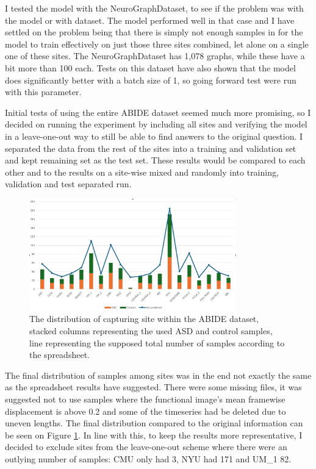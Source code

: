 	I tested the model with the NeuroGraphDataset\cite{said2023neurograph}, to see if the problem was with the model or with dataset. The model performed well in that case and I have settled on the problem being that there is simply not enough samples in for the model to train effectively on just those three sites combined, let alone on a single one of these sites. The NeuroGraphDataset has 1,078 graphs, while these have a bit more than 100 each. Tests on this dataset have also shown that the model does significantly better with a batch size of 1, so going forward test were run with this parameter.
	
	Initial tests of using the entire ABIDE dataset seemed much more promising, so I decided on running the experiment by including all sites and verifying the model in a leave-one-out way to still be able to find answers to the original question. I separated the data from the rest of the sites into a training and validation set and kept remaining set as the test set. These results would be compared to each other and to the results on a site-wise mixed and randomly into training, validation and test separated run.
	
	\begin{figure}[!h]
		\centering
		\label{fig:final_distribution}
		\includegraphics[width=0.8\textwidth]{figures/abide_samples.png}
		\caption{The distribution of capturing site within the ABIDE dataset, stacked columns representing the used ASD and control samples, line representing the supposed total number of samples according to the spreadsheet.}
	\end{figure}
	
	The final distribution of samples among sites was in the end not exactly the same as the spreadsheet results have suggested. There were some missing files, it was suggested not to use samples where the functional image's mean framewise displacement is above 0.2 and some of the timeseries had be deleted due to uneven lengths. The final distribution compared to the original information can be seen on Figure \ref{fig:final_distribution}. In line with this, to keep the results more representative, I decided to exclude sites from the leave-one-out scheme where there were an outlying number of samples: CMU only had 3, NYU had 171 and UM\_1 82.
	

